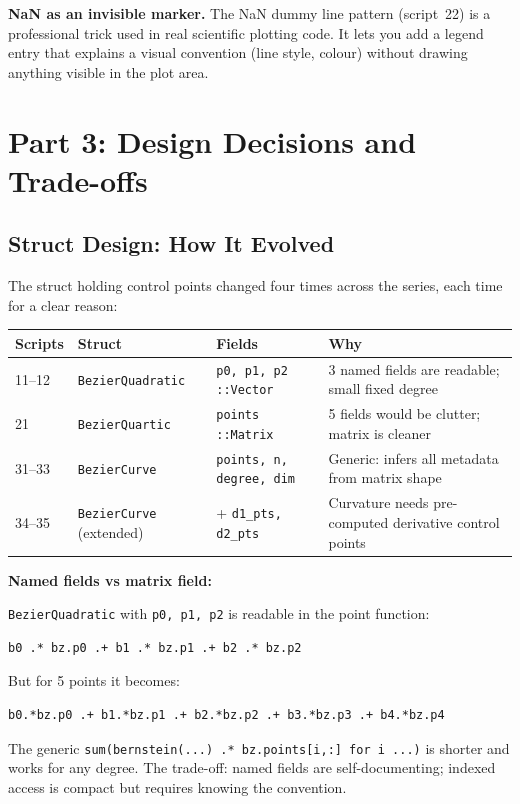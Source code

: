 \documentclass[12pt, a4paper]{article}
\newcommand{\cd}[1]{\texttt{#1}}
\begin{document}
\begin{insightbox}
\textbf{NaN as an invisible marker.}
The NaN dummy line pattern (script~22) is a professional
trick used in real scientific plotting code.
It lets you add a legend entry that explains a visual
convention (line style, colour) without drawing anything
visible in the plot area.
\end{insightbox}


\section{Part 3: Design Decisions and Trade-offs}

\subsection{Struct Design: How It Evolved}

The struct holding control points changed four times across
the series, each time for a clear reason:

\begin{center}
\renewcommand{\arraystretch}{1.3}
\begin{tabular}{lp{3.0cm}p{3.0cm}p{3.5cm}}
\toprule
Scripts & Struct & Fields & Why \\
\midrule
11--12 &
  \cd{BezierQuadratic} &
  \cd{p0, p1, p2 ::Vector} &
  3 named fields are readable; small fixed degree \\[4pt]
21 &
  \cd{BezierQuartic} &
  \cd{points ::Matrix} &
  5 fields would be clutter; matrix is cleaner \\[4pt]
31--33 &
  \cd{BezierCurve} &
  \cd{points, n, degree, dim} &
  Generic: infers all metadata from matrix shape \\[4pt]
34--35 &
  \cd{BezierCurve} (extended) &
  + \cd{d1\_pts, d2\_pts} &
  Curvature needs pre-computed derivative control points \\
\bottomrule
\end{tabular}
\end{center}

\begin{tradebox}
\textbf{Named fields vs matrix field:}

\cd{BezierQuadratic} with \cd{p0, p1, p2} is readable
in the point function:
\begin{verbatim}
b0 .* bz.p0 .+ b1 .* bz.p1 .+ b2 .* bz.p2
\end{verbatim}

But for 5 points it becomes:
\begin{verbatim}
b0.*bz.p0 .+ b1.*bz.p1 .+ b2.*bz.p2 .+ b3.*bz.p3 .+ b4.*bz.p4
\end{verbatim}

The generic \cd{sum(bernstein(...) .* bz.points[i,:] for i ...)}
is shorter and works for any degree.
The trade-off: named fields are self-documenting;
indexed access is compact but requires knowing the convention.
\end{tradebox}
\end{document}
